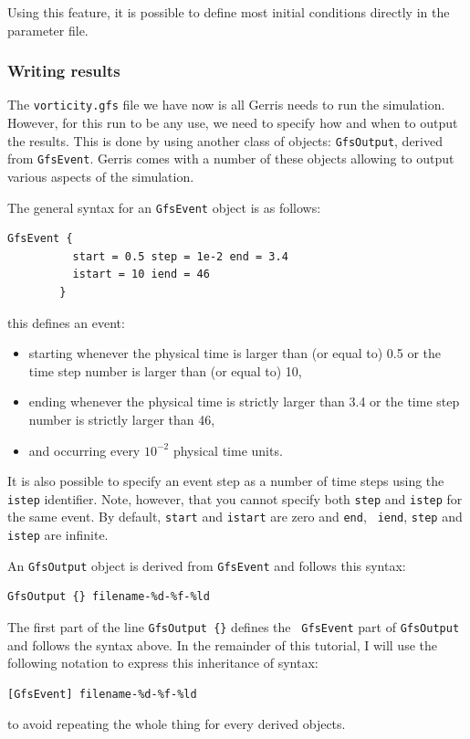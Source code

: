 \documentclass[a4paper]{article}
\begin{document}
Using this feature, it is possible to define most initial conditions directly in the parameter file.

\subsubsection{Writing results}

The {\tt vorticity.gfs} file we have now is all Gerris needs to run the
simulation. However, for this run to be any use, we need to specify
how and when to output the results. This is done by using another
class of objects: {\tt GfsOutput}, derived from {\tt GfsEvent}. Gerris
comes with a number of these objects allowing to output various
aspects of the simulation.

The general syntax for an {\tt GfsEvent} object is as follows:
\begin{verbatim}
GfsEvent {
          start = 0.5 step = 1e-2 end = 3.4
          istart = 10 iend = 46
        }
\end{verbatim}
this defines an event:
\begin{itemize}
\item starting whenever the physical time is larger
than (or equal to) 0.5 or the time step number is larger than (or
equal to) 10,
\item ending whenever the physical time is strictly larger than 3.4 or 
the time step number is strictly larger than 46,
\item and occurring every $10^{-2}$ physical time units.
\end{itemize}
It is also possible to specify an event step as a number of time steps 
using the {\tt istep} identifier. Note, however, that you cannot
specify both {\tt step} and {\tt istep} for the same event. By
default, {\tt start} and {\tt istart} are zero and {\tt end}, {\tt
iend}, {\tt step} and {\tt istep} are infinite.

An {\tt GfsOutput} object is derived from {\tt GfsEvent} and follows this 
syntax:
\begin{verbatim}
GfsOutput {} filename-%d-%f-%ld
\end{verbatim}
The first part of the line {\tt GfsOutput \{\}} defines the {\tt
GfsEvent} part of {\tt GfsOutput} and follows the syntax above. In the
remainder of this tutorial, I will use the following notation to
express this inheritance of syntax:
\begin{verbatim}
[GfsEvent] filename-%d-%f-%ld
\end{verbatim}
to avoid repeating the whole thing for every derived objects.
\end{document}
